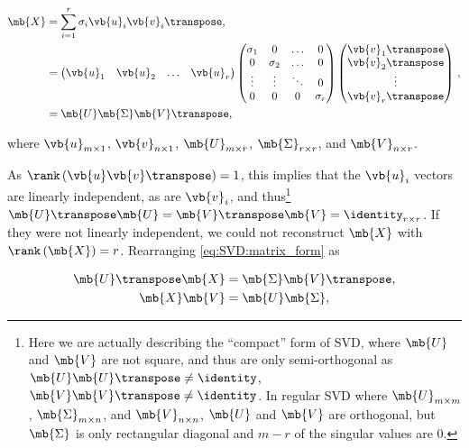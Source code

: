 \begin{subequations}\label{eq:SVD}
\begin{align}
\mb{X} &= \sum_{i=1}^{r} \sigma_{i} \vb{u}_{i} \vb{v}_{i}\transpose, \label{eq:SVD:sum} \\
&= \begin{pmatrix}
  \vb{u}_{1} & \vb{u}_{2} & \ldots & \vb{u}_{r}
\end{pmatrix}
\begin{pmatrix}
  \sigma_{1} & 0          & \ldots & 0 \\
  0          & \sigma_{2} & \ldots & 0 \\
  \vdots     & \vdots     & \ddots & 0 \\
  0          & 0          & 0      & \sigma_{r}
\end{pmatrix}
\begin{pmatrix}
  \vb{v}_{1}\transpose \\
  \vb{v}_{2}\transpose \\
  \vdots \\
  \vb{v}_{r}\transpose
\end{pmatrix}\,, \label{eq:SVD:expanded} \\
&= \mb{U} \mb{\Sigma} \mb{V}\transpose, \label{eq:SVD:matrix_form}
\end{align}
\end{subequations}

\noindent where $\vb{u}_{m \times 1}$, $\vb{v}_{n \times 1}$,
$\mb{U}_{m \times r}$, $\mb{\Sigma}_{r \times r}$, and $\mb{V}_{n \times r}$.

As $\rank\left(\vb{u} \vb{v}\transpose\right) = 1$,
this implies that the $\vb{u}_{i}$ vectors are linearly independent, as are $\vb{v}_{i}$,
and thus\footnote{Here we are actually describing the ``compact'' form of SVD,
where $\mb{U}$ and $\mb{V}$ are not square, and thus are only semi-orthogonal
as $\mb{U} \mb{U}\transpose \neq \identity$, $\mb{V} \mb{V}\transpose \neq \identity$.
In regular SVD where $\mb{U}_{m \times m}$, $\mb{\Sigma}_{m \times n}$, and $\mb{V}_{n \times n}$,
$\mb{U}$ and $\mb{V}$ are orthogonal,
but $\mb{\Sigma}$ is only rectangular diagonal and $m-r$ of the singular values
are 0.} $\mb{U}\transpose \mb{U} = \mb{V}\transpose \mb{V} = \identity_{r \times r}$.
If they were not linearly independent,
we could not reconstruct $\mb{X}$ with $\rank\left(\mb{X}\right) = r$.
Rearranging \cref{eq:SVD:matrix_form} as

\begin{subequations}\label{eq:SVD:left_right}
\begin{align}
\mb{U}\transpose \mb{X} &= \mb{\Sigma} \mb{V}\transpose, \label{eq:SVD:left_right:left} \\
\mb{X} \mb{V} &= \mb{U} \mb{\Sigma}, \label{eq:SVD:left_right:right}
\end{align}
\end{subequations}

